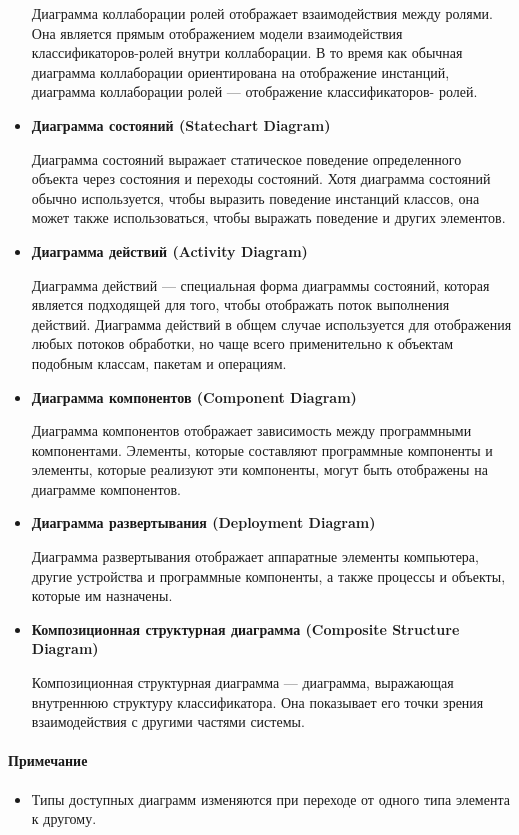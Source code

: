 \documentclass[a4paper,12pt]{extreport}
\begin{document}
\begin{itemize}
Диаграмма коллаборации ролей отображает взаимодействия между ролями. Она является
прямым отображением модели взаимодействия классификаторов-ролей внутри
коллаборации. В то время как обычная диаграмма коллаборации ориентирована на
отображение инстанций, диаграмма коллаборации ролей --- отображение классификаторов-
ролей.
\item\textbf{ Диаграмма состояний (Statechart Diagram)}

Диаграмма состояний выражает статическое поведение определенного объекта через
состояния и переходы состояний. Хотя диаграмма состояний обычно используется, чтобы
выразить поведение инстанций классов, она может также использоваться, чтобы выражать
поведение и других элементов.
\item \textbf{Диаграмма действий (Activity Diagram)}

Диаграмма действий --- специальная форма диаграммы состояний, которая является
подходящей для того, чтобы отображать поток выполнения действий. Диаграмма действий в
общем случае используется для отображения любых потоков обработки, но чаще всего
применительно к объектам подобным классам, пакетам и операциям.
\item \textbf{Диаграмма компонентов (Component Diagram)}

Диаграмма компонентов отображает зависимость между программными компонентами.
Элементы, которые составляют программные компоненты и элементы, которые реализуют
эти компоненты, могут быть отображены на диаграмме компонентов.
\item \textbf{Диаграмма развертывания (Deployment Diagram)}

Диаграмма развертывания отображает аппаратные элементы компьютера, другие
устройства и программные компоненты, а также процессы и объекты, которые им
назначены.
\item \textbf{Композиционная структурная диаграмма (Composite Structure Diagram)}

Композиционная структурная диаграмма --- диаграмма, выражающая внутреннюю структуру
классификатора. Она показывает его точки зрения взаимодействия с другими частями
системы.

\end{itemize}
\paragraph*{Примечание}
\begin{itemize}
	\item Типы доступных диаграмм изменяются при переходе от одного типа элемента к другому.
\end{itemize}
\end{document}
